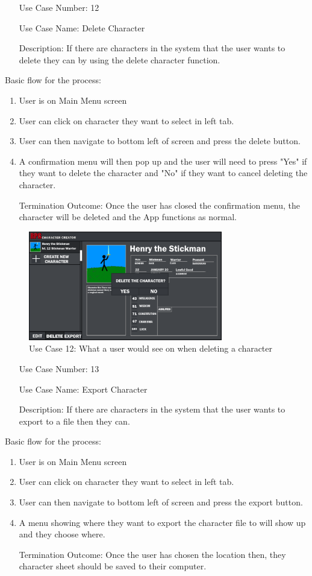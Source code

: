 \documentclass[10pt,conference,onecolumn,compsoc]{IEEEtran}
\begin{document}
\begin{itemize}
\item[Use Case Number:] 12
\item[Use Case Name:] Delete Character
\item[Description:] If there are characters in the system that the user wants to delete they can by using the delete character function.
\end{itemize}
Basic flow for the process:
\begin{enumerate}
\item User is on Main Menu screen
\item User can click on character they want to select in left tab.
\item User can then navigate to bottom left of screen and press the delete button.
\item A confirmation menu will then pop up and the user will need to press "Yes" if they want to delete the character and "No" if they want to cancel deleting the character.
\item[Termination Outcome:] Once the user has closed the confirmation menu, the character will be deleted and the App functions as normal.
\end{enumerate}

\begin{figure}[ht!]
\includegraphics[height=180px, width=320px]{CSCI 352 Interface Mockups/Interface Mockup 1.5.png}
\caption{Use Case 12: What a user would see on when deleting a character}
\centering
\label{mockup}
\end{figure}

\begin{itemize}
\item[Use Case Number:] 13
\item[Use Case Name:] Export Character
\item[Description:] If there are characters in the system that the user wants to export to a file then they can.
\end{itemize}
Basic flow for the process:
\begin{enumerate}
\item User is on Main Menu screen
\item User can click on character they want to select in left tab.
\item User can then navigate to bottom left of screen and press the export button.
\item A menu showing where they want to export the character file to will show up and they choose where.
\item[Termination Outcome:] Once the user has chosen the location then, they character sheet should be saved to their computer.
\end{enumerate}
\end{document}
